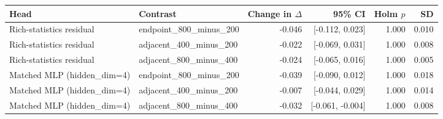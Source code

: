 \begin{tabular}{llrrrr}
\toprule
Head & Contrast & Change in $\Delta$ & 95\% CI & Holm $p$ & SD \\
\midrule
Rich-statistics residual & endpoint\_800\_minus\_200 & -0.046 & [-0.112, 0.023] & 1.000 & 0.010 \\
Rich-statistics residual & adjacent\_400\_minus\_200 & -0.022 & [-0.069, 0.031] & 1.000 & 0.008 \\
Rich-statistics residual & adjacent\_800\_minus\_400 & -0.024 & [-0.065, 0.016] & 1.000 & 0.005 \\
Matched MLP (hidden\_dim=4) & endpoint\_800\_minus\_200 & -0.039 & [-0.090, 0.012] & 1.000 & 0.018 \\
Matched MLP (hidden\_dim=4) & adjacent\_400\_minus\_200 & -0.007 & [-0.044, 0.029] & 1.000 & 0.014 \\
Matched MLP (hidden\_dim=4) & adjacent\_800\_minus\_400 & -0.032 & [-0.061, -0.004] & 1.000 & 0.008 \\
\bottomrule
\end{tabular}
